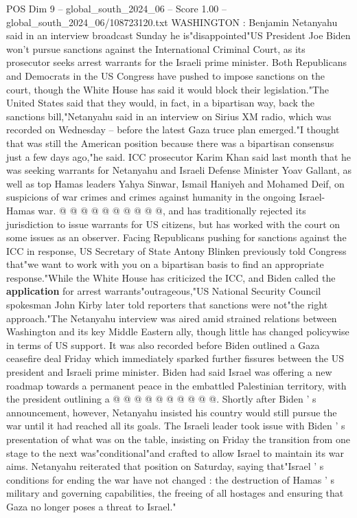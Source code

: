 \begin{textsample}{POS Dim 9 – global\_south\_2024\_06 – Score 1.00 – global\_south\_2024\_06/108723120.txt}  \label{ex:f9_pos_094}
WASHINGTON : Benjamin Netanyahu said in an interview broadcast Sunday he is"disappointed"US President Joe Biden won't pursue sanctions against the International Criminal Court, as its prosecutor seeks arrest warrants for the Israeli prime minister.
Both Republicans and Democrats in the US Congress have pushed to impose sanctions on the court, though the White House has said it would block their legislation."The United States said that they would, in fact, in a bipartisan way, back the sanctions bill,"Netanyahu said in an interview on Sirius XM radio, which was recorded on Wednesday -- before the latest Gaza truce plan emerged."I thought that was still the American position because there was a bipartisan consensus just a few days ago,"he said.
ICC prosecutor Karim Khan said last month that he was seeking warrants for Netanyahu and Israeli Defense Minister Yoav Gallant, as well as top Hamas leaders Yahya Sinwar, Ismail Haniyeh and Mohamed Deif, on suspicions of war crimes and crimes against humanity in the ongoing Israel-Hamas war. @ @ @ @ @ @ @ @ @ @, and has traditionally rejected its jurisdiction to issue warrants for US citizens, but has worked with the court on some issues as an observer.
Facing Republicans pushing for sanctions against the ICC in response, US Secretary of State Antony Blinken previously told Congress that"we want to work with you on a bipartisan basis to find an appropriate response."While the White House has criticized the ICC, and Biden called the \textbf{application} for arrest warrants"outrageous,"US National Security Council spokesman John Kirby later told reporters that sanctions were not"the right approach."The Netanyahu interview was aired amid strained relations between Washington and its key Middle Eastern ally, though little has changed policywise in terms of US support.
It was also recorded before Biden outlined a Gaza ceasefire deal Friday which immediately sparked further fissures between the US president and Israeli prime minister.
Biden had said Israel was offering a new roadmap towards a permanent peace in the embattled Palestinian territory, with the president outlining a @ @ @ @ @ @ @ @ @ @.
Shortly after Biden ' s announcement, however, Netanyahu insisted his country would still pursue the war until it had reached all its goals.
The Israeli leader took issue with Biden ' s presentation of what was on the table, insisting on Friday the transition from one stage to the next was"conditional"and crafted to allow Israel to maintain its war aims.
Netanyahu reiterated that position on Saturday, saying that"Israel ' s conditions for ending the war have not changed : the destruction of Hamas ' s military and governing capabilities, the freeing of all hostages and ensuring that Gaza no longer poses a threat to Israel."

\end{textsample}
